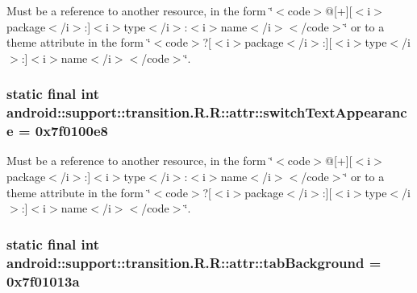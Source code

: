 Must be a reference to another resource, in the form \char`\"{}$<$code$>$@\mbox{[}+\mbox{]}\mbox{[}$<$i$>$package$<$/i$>$:\mbox{]}$<$i$>$type$<$/i$>$:$<$i$>$name$<$/i$>$$<$/code$>$\char`\"{} or to a theme attribute in the form \char`\"{}$<$code$>$?\mbox{[}$<$i$>$package$<$/i$>$:\mbox{]}\mbox{[}$<$i$>$type$<$/i$>$:\mbox{]}$<$i$>$name$<$/i$>$$<$/code$>$\char`\"{}. \hypertarget{classandroid_1_1support_1_1transition_1_1_r_1_1attr_8c2f8fbbec285613b553ffc737eaa7f5}{
\subsubsection[{switchTextAppearance}]{\setlength{\rightskip}{0pt plus 5cm}static final int android::support::transition.R.R::attr::switchTextAppearance = 0x7f0100e8}}
\label{classandroid_1_1support_1_1transition_1_1_r_1_1attr_8c2f8fbbec285613b553ffc737eaa7f5}


Must be a reference to another resource, in the form \char`\"{}$<$code$>$@\mbox{[}+\mbox{]}\mbox{[}$<$i$>$package$<$/i$>$:\mbox{]}$<$i$>$type$<$/i$>$:$<$i$>$name$<$/i$>$$<$/code$>$\char`\"{} or to a theme attribute in the form \char`\"{}$<$code$>$?\mbox{[}$<$i$>$package$<$/i$>$:\mbox{]}\mbox{[}$<$i$>$type$<$/i$>$:\mbox{]}$<$i$>$name$<$/i$>$$<$/code$>$\char`\"{}. \hypertarget{classandroid_1_1support_1_1transition_1_1_r_1_1attr_c9a261a28399c8f1be4142e4ef277959}{
\subsubsection[{tabBackground}]{\setlength{\rightskip}{0pt plus 5cm}static final int android::support::transition.R.R::attr::tabBackground = 0x7f01013a}}
\label{classandroid_1_1support_1_1transition_1_1_r_1_1attr_c9a261a28399c8f1be4142e4ef277959}


